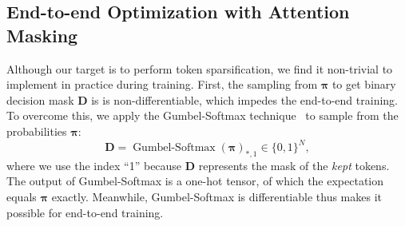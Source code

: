 \documentclass{article}
\DeclareMathOperator{\gumbelsoftmax}{Gumbel-Softmax}
\begin{document}
\subsection{End-to-end Optimization with Attention Masking}
Although our target is to perform token sparsification, we find it non-trivial to implement in practice during training. First, the sampling from $\bm{\pi}$ to get binary decision mask $\mathbf{D}$ is is non-differentiable, which impedes the end-to-end training. To overcome this, we  apply the Gumbel-Softmax technique~\cite{eric2017gumbel} to sample from the probabilities $\bm{\pi}$:
\begin{equation}
    \mathbf{D} = \gumbelsoftmax(\bm{\pi})_{*, 1}\in \{0, 1\}^{N},
\end{equation}
where we use the index ``1'' because $\mathbf{D}$ represents the mask of the \emph{kept} tokens. The output of  Gumbel-Softmax is a
one-hot tensor, of which the expectation equals $\bm{\pi}$ exactly. Meanwhile, Gumbel-Softmax is differentiable thus makes it possible for end-to-end training.
\end{document}
